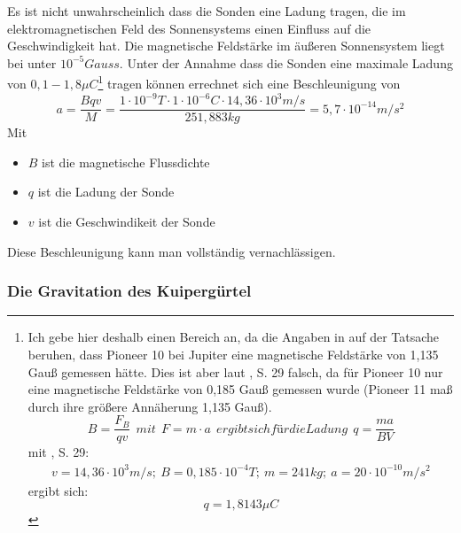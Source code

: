 Es ist nicht unwahrscheinlich dass die Sonden eine Ladung tragen, die im
elektromagnetischen Feld des Sonnensystems einen Einfluss auf die
Geschwindigkeit hat. Die magnetische Feldst\"arke im \"au{\ss}eren
Sonnensystem liegt bei unter $10^{-5}\mathit{Gauss}$\cite{Anderson2002}.
Unter der Annahme dass die Sonden eine maximale Ladung von $0,1-1,8\mu
C$\footnote{ %
Ich gebe hier deshalb einen Bereich an, da die Angaben in \cite{Null1976} auf der Tatsache beruhen, dass
Pioneer 10 bei Jupiter eine magnetische Feldst\"arke von 1,135 Gau{\ss}
gemessen h\"atte. Dies ist aber laut \cite{Anderson2002}, S. 29 falsch, da f\"ur Pioneer 10 nur eine
magnetische Feldst\"arke von 0,185 Gau{\ss} gemessen wurde (Pioneer 11
ma{\ss} durch ihre gr\"o{\ss}ere Ann\"aherung 1,135 Gau{\ss}).
\begin{equation*}
B=\frac{F_{B}}{\mathit{qv}}\ \ \mathit{mit}\ \ F=m\cdot
a\ \ \mathit{ergibt}\mathit{sich}\mathit{f\text{\"u}r}\mathit{die}\mathit{Ladung}\ \ q=\frac{\mathit{ma}}{\mathit{BV}}
\end{equation*}
mit \cite{Anderson2002}, S. 29:
\begin{equation*}
\begin{gathered}v=14,36\cdot 10^{3}m/s;\ B=0,185\cdot
10^{-4}T;\ m=241\mathit{kg};\ a=20\cdot 10^{-10}m/s^{2}\end{gathered}
\end{equation*}
ergibt sich:
\begin{equation*}
q=1,8143\mu C
\end{equation*}}
tragen k\"onnen errechnet sich eine Beschleunigung von
\begin{equation}
a=\frac{\mathit{Bqv}}{M}=\frac{1\cdot 10^{-9}T\cdot 1\cdot
10^{-6}C\cdot 14,36\cdot 10^{3}m/s}{251,883\mathit{kg}}=5,7\cdot
10^{-14}m/s^{2}
\end{equation}
Mit 
\begin{itemize}
\item $B$ ist die magnetische Flussdichte
\item $q$ ist die Ladung der Sonde
\item $v$ ist die Geschwindikeit der Sonde
\end{itemize}

Diese Beschleunigung kann man vollst\"andig vernachl\"assigen.


\bigskip

\subsubsection{ Die Gravitation des Kuiperg\"urtel}


